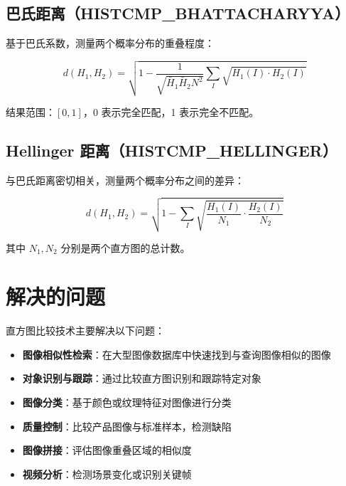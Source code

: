 \documentclass{article}
\begin{document}
\subsection{巴氏距离（HISTCMP\_BHATTACHARYYA）}

基于巴氏系数，测量两个概率分布的重叠程度：

\begin{equation}
d(H_1,H_2) = \sqrt{1 - \frac{1}{\sqrt{\bar{H}_1 \bar{H}_2 N^2}} \sum_I \sqrt{H_1(I) \cdot H_2(I)}}
\end{equation}

结果范围：$[0, 1]$，0 表示完全匹配，1 表示完全不匹配。

\subsection{Hellinger 距离（HISTCMP\_HELLINGER）}

与巴氏距离密切相关，测量两个概率分布之间的差异：

\begin{equation}
d(H_1,H_2) = \sqrt{1 - \sum_I \sqrt{\frac{H_1(I)}{N_1} \cdot \frac{H_2(I)}{N_2}}}
\end{equation}

其中 $N_1, N_2$ 分别是两个直方图的总计数。

\section{解决的问题}

直方图比较技术主要解决以下问题：

\begin{itemize}
    \item \textbf{图像相似性检索}：在大型图像数据库中快速找到与查询图像相似的图像

    \item \textbf{对象识别与跟踪}：通过比较直方图识别和跟踪特定对象

    \item \textbf{图像分类}：基于颜色或纹理特征对图像进行分类

    \item \textbf{质量控制}：比较产品图像与标准样本，检测缺陷

    \item \textbf{图像拼接}：评估图像重叠区域的相似度

    \item \textbf{视频分析}：检测场景变化或识别关键帧
\end{itemize}
\end{document}

